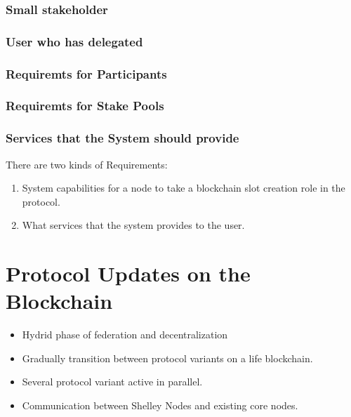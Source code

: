 \documentclass{report}
\theoremstyle{definition}{
  \newtheorem{lemma}{Lemma}[section] %
  \newtheorem{definition}[lemma]{Definition}
}
\theoremstyle{theorem}{
  \newtheorem{invariant}[lemma]{Invariant}
  \newtheorem{proofobligation}[lemma]{Proof Obligation}
}
\numberwithin{equation}{lemma}
\begin{document}
\subsubsection{Small stakeholder}
\subsubsection{User who has delegated}
\subsubsection{Requiremts for Participants}
\subsubsection{Requiremts for Stake Pools}
\subsubsection{Services that the System should provide}

There are two kinds of Requirements:

\begin{enumerate}
\item System capabilities for a node to take a blockchain slot creation role in the protocol.
\item What services that the system provides to the user.
\end{enumerate}



\section{Protocol Updates on the Blockchain}
\begin{itemize}
\item Hydrid phase of federation and decentralization
\item Gradually transition between protocol variants on a life blockchain.
\item Several protocol variant active in parallel.
\item Communication between Shelley Nodes and existing core nodes.
\end{itemize}
\end{document}
